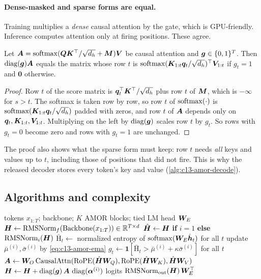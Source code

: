 \paragraph{Dense-masked and sparse forms are equal.} Training multiplies a \emph{dense} causal
attention by the gate, which is GPU-friendly. Inference computes attention only at firing positions.
These agree.

\begin{proposition}\label{prop:c13-amor-sparse}
Let $\bm{A}=\operatorname{softmax}(\bm{Q}\bm{K}^{\top}/\sqrt{d_h}+\bm{M})\bm{V}$ be causal attention and $\bm{g}\in\{0,1\}^T$. Then
$\operatorname{diag}(\bm{g})\bm{A}$ equals the matrix whose row $t$ is $\operatorname{softmax}(\bm{K}_{1:t}\bm{q}_t/\sqrt{d_h})^{\top}\bm{V}_{1:t}$ if
$g_t=1$ and $\bm{0}$ otherwise.
\end{proposition}
\begin{proof}
Row $t$ of the score matrix is $\bm{q}_t^{\top}\bm{K}^{\top}/\sqrt{d_h}$ plus row $t$ of $\bm{M}$, which is $-\infty$ for
$s>t$. The softmax is taken row by row, so row $t$ of $\operatorname{softmax}(\cdot)$ is
$\operatorname{softmax}(\bm{K}_{1:t}\bm{q}_t/\sqrt{d_h})$ padded with zeros, and row $t$ of $\bm{A}$ depends only on
$\bm{q}_t,\bm{K}_{1:t},\bm{V}_{1:t}$. Multiplying on the left by $\operatorname{diag}(\bm{g})$ scales row $t$ by $g_t$. So rows
with $g_t=0$ become zero and rows with $g_t=1$ are unchanged.
\end{proof}

The proof also shows what the sparse form must keep: row $t$ needs \emph{all} keys and values up to
$t$, including those of positions that did not fire. This is why the released decoder stores every
token's key and value (\cref{alg:c13-amor-decode}).

\subsection{Algorithms and complexity}\label{sec:c13-amor-alg}

\begin{algorithm}[t]
\caption{AMOR forward pass (training and prefill), \texttt{classic} residual mode}
\label{alg:c13-amor-forward}
\begin{algorithmic}[1]
\Require tokens $x_{1:T}$; backbone; $K$ AMOR blocks; tied LM head $\bm{W}_E$
\State $\bm{H}\gets\operatorname{RMSNorm}_f(\text{Backbone}(x_{1:T}))\in\mathbb{R}^{T\times d}$
  \State $\hat{\bm{H}}\gets\bm{H}$ \textbf{if} $i=1$ \textbf{else} $\operatorname{RMSNorm}_i(\bm{H})$
  \State $\bar{\mathrm{H}}_t\gets$ normalized entropy of $\operatorname{softmax}(\bm{W}_E\hat{\bm{h}}_t)$ for all $t$ 
    \State update $\bar\mu^{(i)},\bar\sigma^{(i)}$ by \eqref{eq:c13-amor-ema}
  \EndIf
  \State $g_t\gets\mathbf{1}[\bar{\mathrm{H}}_t>\bar\mu^{(i)}+\kappa\bar\sigma^{(i)}]$ for all $t$
  \State $\bm{A}\gets\bm{W}_O\,\mathrm{CausalAttn}(\mathrm{RoPE}(\hat{\bm{H}}\bm{W}_Q),\mathrm{RoPE}(\hat{\bm{H}}\bm{W}_K),\hat{\bm{H}}\bm{W}_V)$ 
  \State $\bm{H}\gets\bm{H}+\operatorname{diag}(\bm{g})\,\bm{A}\,\operatorname{diag}(\bm{\alpha}^{(i)})$
\EndFor
\State \Return logits $\operatorname{RMSNorm}_{\text{out}}(\bm{H})\,\bm{W}_E^{\top}$
\end{algorithmic}
\end{algorithm}

